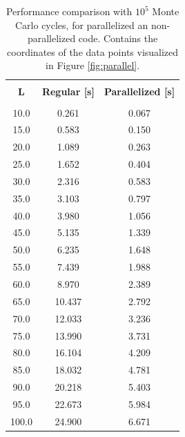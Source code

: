 \documentclass[10pt, nofootinbib, twocolumn]{revtex4-1}
\begin{document}
\begin{center}
    \begin{table}[H]
    \caption{Performance comparison with $10^5$ Monte Carlo cycles, for parallelized an non-parallelized code. Contains the coordinates of the data points visualized in Figure \ref{fig:parallel}.}
        \begin{tabular*}{0.5\textwidth}{@{\extracolsep{\fill}}ccc}
        \toprule
        \hline \\
        \textbf{L}  & \textbf{Regular [s]} & \textbf{Parallelized [s]} \\
        \midrule
        \hline \\
        10.0 &  0.261 & 0.067 \\
        15.0  & 0.583 & 0.150 \\
        20.0 & 1.089 & 0.263 \\
        25.0 &  1.652 & 0.404 \\
        30.0 & 2.316 & 0.583 \\
        35.0 &  3.103 & 0.797 \\
        40.0 & 3.980 & 1.056 \\
        45.0 &  5.135 & 1.339 \\
        50.0 &  6.235 & 1.648 \\
        55.0 & 7.439 & 1.988 \\
        60.0 &  8.970 & 2.389 \\
        65.0 &  10.437 & 2.792 \\
        70.0 &  12.033 & 3.236 \\
        75.0 &  13.990 & 3.731 \\
        80.0 &  16.104 & 4.209 \\
        85.0 & 18.032 & 4.781 \\
        90.0 & 20.218 & 5.403 \\
        95.0 & 22.673 & 5.984 \\
        100.0 &  24.900 & 6.671 \\
        \hline
        \bottomrule
        \end{tabular*}\label{tab:mcctimer}
    \end{table}
\end{center}
\newpage
\end{document}
